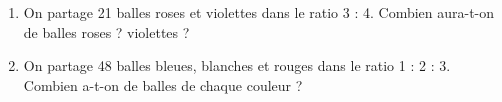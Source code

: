 \begin{changemargin}{-10mm}{-10mm}
\begin{activite}
\begin{enumerate}
\begin{enumerate}
                    \pointilles \medskip
                \end{enumerate}
            \item On partage 21 balles roses et violettes dans le ratio 3 : 4. Combien aura-t-on de balles roses ? violettes ? \par \medskip
                \pointilles \medskip
            \item On partage 48 balles bleues, blanches et rouges dans le ratio 1 : 2 : 3. Combien a-t-on de balles de chaque couleur ? \par \medskip
            \pointilles \medskip
        \end{enumerate}
    \end{activite}
\end{changemargin}

